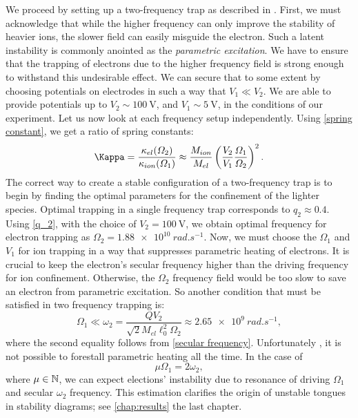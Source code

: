 We proceed by setting up a two-frequency trap as described in \cite{FOOT2018117, trypogeorgos2016cotrapping}. First, we must acknowledge that while the higher frequency can only improve the stability of heavier ions, the slower field can easily misguide the electron. Such a latent instability is commonly anointed as the \emph{parametric excitation}. We have to ensure that the trapping of electrons due to the higher frequency field is strong enough to withstand this undesirable effect. We can secure that to some extent by choosing potentials on electrodes in such a way that $V_1 \ll V_2$. We are able to provide potentials up to $V_2 \sim \SI{100}{\volt}$, and $V_1 \sim \SI{5}{\volt}$, in the conditions of our experiment. Let us now look at each frequency setup independently. Using \eqref{spring constant}, we get a ratio of spring constants:
\begin{equation}
	\label{two frequency ratio}
	\Kappa = \dfrac{\kappa_{el}(\Omega_2)}{\kappa_{ion}(\Omega_1)} \approx \dfrac{M_{ion}}{M_{el}} \left(\dfrac{V_2}{V_1}\dfrac{\Omega_1}{\Omega_2}\right)^2.
\end{equation}
The correct way to create a stable configuration of a two-frequency trap is to begin by finding the optimal parameters for the confinement of the lighter species. Optimal trapping in a single frequency trap corresponds to \cite{gerlich1992inhomogeneous} $q_2 \approx 0.4$. Using \eqref{q_2}, with the choice of $V_2 = \SI{100}{\volt}$, we obtain optimal frequency for electron trapping as $\Omega_2 = \SI{1.88e10}{rad.s^{-1}}$. Now, we must choose the $\Omega_1$ and $V_1$ for ion trapping in a way that suppresses parametric heating of electrons. It is crucial to keep the electron's secular frequency higher than the driving frequency for ion confinement. Otherwise, the $\Omega_2$ frequency field would be too slow to save an electron from parametric excitation. So another condition that must be satisfied in two frequency trapping is:
\begin{equation}
	\label{frequency inequality}
	\Omega_1 \ll \omega_2 = \dfrac{Q V_2}{\sqrt{2} M_{el} \ell_0^2 \Omega_2} \approx \SI{2.65e9}{rad.s^{-1}},
\end{equation}
where the second equality follows from \eqref{secular frequency}. Unfortunately \cite{FOOT2018117}, it is not possible to forestall parametric heating all the time. In the case of $$\mu \Omega_1 = 2 \omega_2,$$
where $\mu \in \mathbb{N}$, we can expect elections' instability due to resonance of driving $\Omega_1$ and secular $\omega_2$ frequency. This estimation clarifies the origin of unstable tongues in stability diagrams; see \ref{chap:results} the last chapter.



